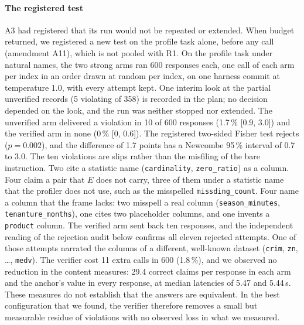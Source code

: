 \documentclass[smallextended,natbib]{svjour3}
\begin{document}
\paragraph{The registered test}
A3 had registered that its run would not be repeated or extended. When budget
returned, we registered a new test on the profile task alone, before any call
(amendment A11), which is not pooled with R1. On the profile task under natural
names, the two strong arms ran 600 responses each, one call of each arm per
index in an order drawn at random per index, on one harness commit at
temperature 1.0, with every attempt kept. One interim look at the partial
unverified records (5 violating of 358) is recorded in the plan; no decision
depended on the look, and the run was neither stopped nor extended. The unverified arm delivered a violation in 10 of 600
responses (1.7\,\% [0.9, 3.0]) and the verified arm in none (0\,\% [0, 0.6]).
The registered two-sided Fisher test rejects ($p=0.002$), and the difference
of 1.7 points has a Newcombe 95\,\% interval of 0.7 to 3.0. The ten violations
are slips rather than the misfiling of the bare instruction. Two cite a
statistic name (\texttt{cardinality}, \texttt{zero\_ratio}) as a column. Four
claim a pair that $E$ does not carry, three of them under a statistic name that
the profiler does not use, such as the misspelled \texttt{missding\_count}.
Four name a column that the frame lacks: two misspell a real column
(\texttt{season\_minutes}, \texttt{tenanture\_months}), one cites two
placeholder columns, and one invents a \texttt{product} column. The verified
arm sent back
ten responses, and the independent reading of the rejection audit below
confirms all eleven rejected attempts. One of those attempts narrated the
columns of a different, well-known dataset (\texttt{crim}, \texttt{zn},
\ldots, \texttt{medv}). The verifier cost 11 extra calls in 600 (1.8\,\%), and
we observed no reduction in the content measures: 29.4 correct claims per
response in each arm and the anchor's value in every response, at median
latencies of 5.47 and 5.44\,s. These measures do not establish that the
answers are equivalent. In the best configuration that we found, the verifier
therefore removes a small but measurable residue of violations with no
observed loss in what we measured.
\end{document}
